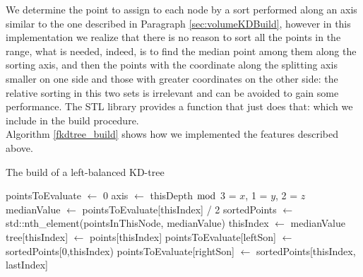 We determine the point to assign to each node by a sort performed along an axis similar to the one described in Paragraph \ref{sec:volumeKDBuild}, however in this implementation we realize that there is no reason to sort all the points in the range, what is needed, indeed, is to find the median point among them along the sorting axis, and then the points with the coordinate along the splitting axis smaller on one side and those with greater coordinates on the other side: the relative sorting in this two sets is irrelevant and can be avoided to gain some performance. The STL library provides a function that just does that:  which we include in the build procedure.\\
Algorithm \ref{fkdtree_build} shows how we implemented the features described above.\\

\begin{algorithm}
\caption{The build of a left-balanced KD-tree}
\label{fkdtree_build}
\begin{algorithmic}
  \State pointsToEvaluate $\gets$ 0
  \State axis $\gets$ thisDepth $\bmod$ 3  = $x$, 1 = $y$, 2 = $z$
	  	\State medianValue $\gets$ pointsToEvaluate[thisIndex] / 2
	  	\State sortedPoints $\gets$ std::nth\_element(pointsInThisNode, medianValue)
	  	\State thisIndex $\gets$ medianValue
	  	\State tree[thisIndex] $\gets$ points[thisIndex]
	  	\State pointsToEvaluate[leftSon] $\gets$ sortedPoints[0,thisIndex)
	  	\State pointsToEvaluate[rightSon] $\gets$ sortedPoints[thisIndex, lastIndex]
	  \EndFor
  \EndFor
\EndProcedure
\end{algorithmic}
\end{algorithm}

